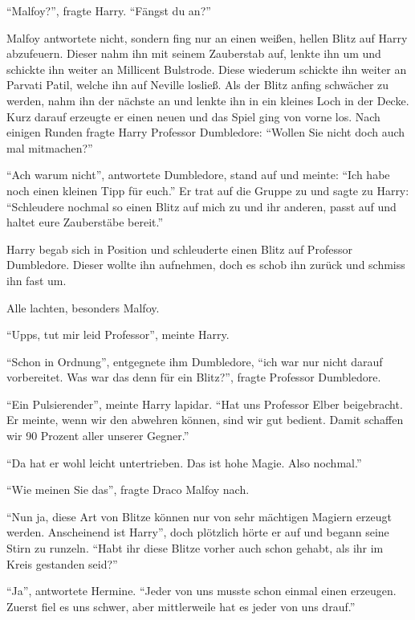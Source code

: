 \enquote{Malfoy?}, fragte Harry. \enquote{Fängst du an?}

Malfoy antwortete nicht, sondern fing nur an einen weißen, hellen Blitz auf Harry abzufeuern. Dieser nahm ihn mit seinem Zauberstab auf, lenkte ihn um und schickte ihn weiter an Millicent Bulstrode. Diese wiederum schickte ihn weiter an Parvati Patil, welche ihn auf Neville losließ. Als der Blitz anfing schwächer zu werden, nahm ihn der nächste an und lenkte ihn in ein kleines Loch in der Decke. Kurz darauf erzeugte er einen neuen und das Spiel ging von vorne los. Nach einigen Runden fragte Harry Professor Dumbledore: \enquote{Wollen Sie nicht doch auch mal mitmachen?}

\enquote{Ach \gst warum nicht}, antwortete Dumbledore, stand auf und meinte: \enquote{Ich habe noch einen kleinen Tipp für euch.} Er trat auf die Gruppe zu und sagte zu Harry: \enquote{Schleudere nochmal so einen Blitz auf mich zu und ihr anderen, passt auf und haltet eure Zauberstäbe bereit.}

Harry begab sich in Position und schleuderte einen Blitz auf Professor Dumbledore. Dieser wollte ihn aufnehmen, doch es schob ihn zurück und schmiss ihn fast um.

Alle lachten, besonders Malfoy.

\enquote{Upps, tut mir leid Professor}, meinte Harry.

\enquote{Schon in Ordnung}, entgegnete ihm Dumbledore, \enquote{ich war nur nicht darauf vorbereitet. Was war das denn für ein Blitz?}, fragte Professor Dumbledore.

\enquote{Ein Pulsierender}, meinte Harry lapidar. \enquote{Hat uns Professor Elber beigebracht. Er meinte, wenn wir den abwehren können, sind wir gut bedient. Damit schaffen wir 90 Prozent aller unserer Gegner.}

\enquote{Da hat er wohl leicht untertrieben. Das ist hohe Magie. Also nochmal.}

\enquote{Wie meinen Sie das}, fragte Draco Malfoy nach.

\enquote{Nun ja, diese Art von Blitze können nur von sehr mächtigen Magiern erzeugt werden. Anscheinend ist Harry\abs}, doch plötzlich hörte er auf und begann seine Stirn zu runzeln. \enquote{Habt ihr diese Blitze vorher auch schon gehabt, als ihr im Kreis gestanden seid?}

\enquote{Ja}, antwortete Hermine. \enquote{Jeder von uns musste schon einmal einen erzeugen. Zuerst fiel es uns schwer, aber mittlerweile hat es jeder von uns drauf.}

